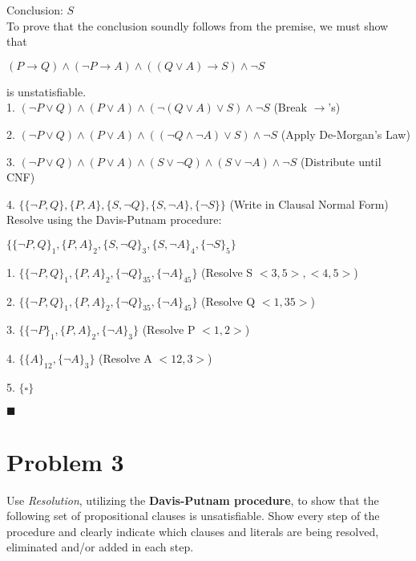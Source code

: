 \documentclass{article}
\newcommand{\tOne}{7.5cm}
\begin{document}
Conclusion: $S$\\

To prove that the conclusion soundly follows from the premise, we must show that

\begin{center}
$(P \rightarrow Q) \wedge (\neg{P} \rightarrow A) \wedge ((Q \vee A) \rightarrow S) \wedge \neg{S}$
\end{center}

is unstatisfiable.\\

1. $(\neg{P} \vee Q) \wedge (P \vee A) \wedge (\neg(Q \vee A) \vee S) \wedge \neg{S}$ \tabto{\tOne}(Break $\rightarrow$'s)

2. $(\neg{P} \vee Q) \wedge (P \vee A) \wedge ((\neg{Q} \wedge \neg{A}) \vee S) \wedge \neg{S}$ \tabto{\tOne}(Apply De-Morgan's Law)

3. $(\neg{P} \vee Q) \wedge (P \vee A) \wedge (S \vee \neg{Q}) \wedge (S \vee \neg{A}) \wedge \neg{S}$ (Distribute until CNF)

4. $\{\{\neg{P}, Q\}, \{P, A\}, \{S, \neg{Q}\}, \{S, \neg{A}\}, \{\neg{S}\}\}$ \tabto{\tOne}(Write in Clausal Normal Form)\\

Resolve using the Davis-Putnam procedure:

$\{\{\neg{P}, Q\}_1, \{P, A\}_2, \{S, \neg{Q}\}_3, \{S, \neg{A}\}_4, \{\neg{S}\}_5\}$

1. $\{\{\neg{P}, Q\}_1, \{P, A\}_2, \{\neg{Q}\}_{35}, \{\neg{A}\}_{45}\}$ \tabto{\tOne}(Resolve S $<3, 5>, <4, 5>$)

2. $\{\{\neg{P}, Q\}_1, \{P, A\}_2, \{\neg{Q}\}_{35}, \{\neg{A}\}_{45}\}$ \tabto{\tOne}(Resolve Q $<1, 35>$)

3. $\{\{\neg{P}\}_1, \{P, A\}_2, \{\neg{A}\}_3\}$ \tabto{\tOne}(Resolve P $<1, 2>$)

4. $\{\{A\}_{12}, \{\neg{A}\}_3\}$ \tabto{\tOne}(Resolve A $<12, 3>$)

5. $\{\square\}$

$
\blacksquare
$
\pagebreak

\section*{Problem 3}
Use \emph{Resolution}, utilizing the \textbf{Davis-Putnam procedure}, to show that the following set of propositional clauses is unsatisfiable. Show every step of the procedure and clearly indicate which clauses and literals are being resolved, eliminated and/or added in each step.\\
\end{document}
